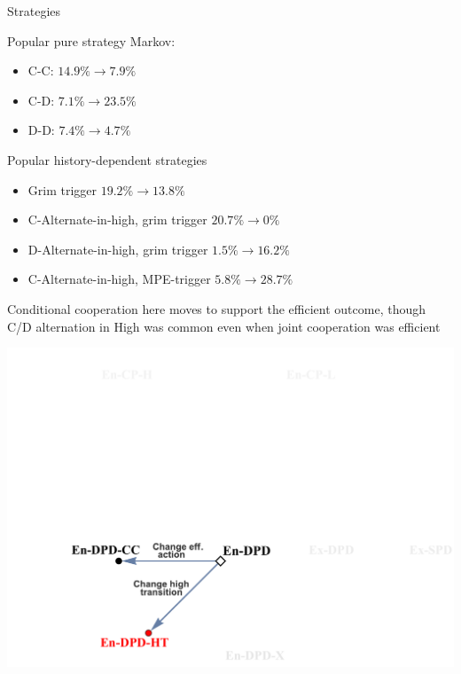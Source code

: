 \documentclass{beamer}
\begin{document}
\begin{frame}{Strategies}
\begin{card}
Popular pure strategy Markov:

\begin{itemize}
\item C-C: $14.9\%\rightarrow7.9\%$
\item C-D: $7.1\%\rightarrow23.5\%$
\item D-D: $7.4\%\rightarrow4.7\%$
\end{itemize}
\end{card}

\begin{card} Popular history-dependent strategies
\begin{itemize}
\item Grim trigger $19.2\%\rightarrow13.8\%$
\item C-Alternate-in-high, grim trigger $20.7\%\rightarrow0\%$
\item D-Alternate-in-high, grim trigger $1.5\%\rightarrow16.2\%$
\item C-Alternate-in-high, MPE-trigger $5.8\%\rightarrow28.7\%$
\end{itemize}
\end{card}
\end{frame}


\begin{frame}
\begin{card}[Result 2]
Conditional cooperation here moves to support the efficient
outcome, though C/D alternation in High was common even when joint
cooperation was efficient
\end{card}
\end{frame}

\begin{frame}
\begin{card}
\begin{center}
\includegraphics[height=0.7\textwidth]{./i/FlowChart3.pdf}
\end{center}
\end{card}
\end{frame}
\end{document}
